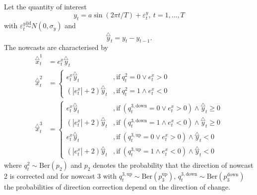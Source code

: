\documentclass[oneside]{article}
\theoremstyle{plain}%
\theoremstyle{definition}
\newcommand{\ydiff}{\overset{\triangle}{y}}
\newcommand{\xdiff}{\overset{\triangle}{x}}
\begin{document}
Let the quantity of interest 
\begin{equation}
  y_t = a \sin(2 \pi t / T) + \varepsilon_t^y, \ t = 1, \dots, T
\end{equation}
with $\varepsilon_t^y \stackrel{\text{iid}}{\sim} N(0, \sigma_y)$ and 
\begin{equation}
  \ydiff_t = y_t - y_{t-1}.
\end{equation}
The nowcasts are characterised by 
\begin{align}
	\xdiff_t^1 &= e^x_t \ydiff_t \\
	\xdiff_t^2 &= \begin{cases}
		e^x_t \ydiff_t &, \text{if}\ q^2_t = 0 \lor e^x_t > 0\\
		(| e^x_t | + 2) \ydiff_t &, \text{if}\ q^2_t = 1 \land e^x_t < 0
	\end{cases} \\
	\xdiff_t^3 &= \begin{cases}
		e^x_t \ydiff_t &, \text{if}\ (q^{3, \text{down}}_t = 0 \lor e^x_t > 0) \land \ydiff_t \geq 0\\
		(| e^x_t | + 2) \ydiff_t &, \text{if}\ (q^{3, \text{down}}_t = 1 \land e^x_t < 0) \land \ydiff_t \geq 0 \\
		e^x_t \ydiff_t &, \text{if}\ (q^{3, \text{up}}_t = 0 \lor e^x_t > 0) \land \ydiff_t < 0\\
		(| e^x_t | + 2) \ydiff_t &, \text{if}\ (q^{3, \text{up}}_t = 1 \land e^x_t < 0) \land \ydiff_t < 0
	\end{cases}
\end{align}
where $q^2_t \sim \text{Ber}(p_2)$ and $p_2$ denotes the probability that the direction of nowcast 2 is corrected and for nowcast 3 with $q^{3, \text{up}}_t \sim \text{Ber}(p_3^{\text{up}})$, $q^{3, \text{down}}_t \sim \text{Ber}(p_3^{\text{down}})$ the probabilities of direction correction depend on the direction of change.
\end{document}
